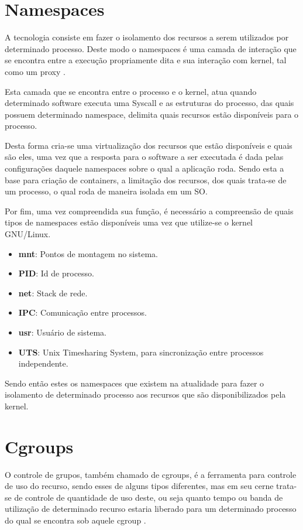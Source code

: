 \section{Namespaces}
\label{chp:referencial_teorico::sct:namespace}
A tecnologia consiste em fazer o isolamento dos recursos a serem utilizados por determinado processo. Deste modo o namespaces é uma camada de interação que se encontra entre a execução propriamente dita e sua interação com kernel, tal como um proxy \cite{kernelscheepers}.

Esta camada que se encontra entre o processo e o kernel, atua quando determinado software executa uma Syscall e as estruturas do processo, das quais possuem determinado namespace, delimita quais recursos estão disponíveis para o processo.

Desta forma cria-se uma virtualização dos recursos que estão disponíveis e quais são eles, uma vez que a resposta para o software a ser executada é dada pelas configurações daquele namespaces sobre o qual a aplicação roda. Sendo esta a base para criação de containers, a limitação dos recursos, dos quais trata-se de um processo, o qual roda de maneira isolada em um SO.

Por fim, uma vez compreendida sua função, é necessário a compreensão de quais tipos de namespaces estão disponíveis uma vez que utilize-se o kernel GNU/Linux.

\begin{itemize}
    \item \textbf{mnt}: Pontos de montagem no sistema.
    \item \textbf{PID}: Id de processo.
    \item \textbf{net}: Stack de rede.
    \item \textbf{IPC}: Comunicação entre processos.
    \item \textbf{usr}: Usuário de sistema.
    \item \textbf{UTS}: Unix Timesharing System, para sincronização entre processos independente.
\end{itemize}

Sendo então estes os namespaces que existem na atualidade para fazer o isolamento de determinado processo aos recursos que são disponibilizados pela kernel.

\section{Cgroups}
\label{chp:referencial_teorico::sct:cgroup}
O controle de grupos, também chamado de cgroups, é a ferramenta para controle de uso do recurso, sendo esses de alguns tipos diferentes, mas em seu cerne trata-se de controle de quantidade de uso deste, ou seja quanto tempo ou banda de utilização de determinado recurso estaria liberado para um determinado processo do qual se encontra sob aquele cgroup \cite{kernelscheepers, secrypt22}.

